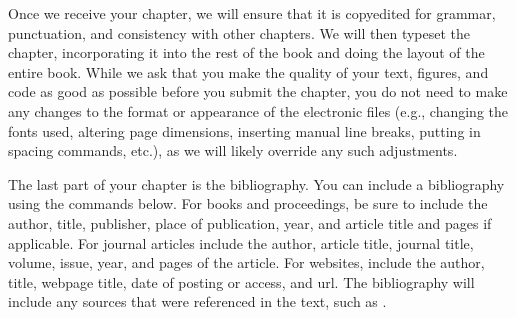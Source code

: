 Once we receive your chapter, we will ensure that it is copyedited for grammar, punctuation, and consistency with other chapters. We will then typeset the chapter, incorporating it into the rest of the book and doing the layout of the entire book. While we ask that you make the quality of your text, figures, and code as good as possible before you submit the chapter, you do not need to make any changes to the format or appearance of the electronic files (e.g., changing the fonts used, altering page dimensions, inserting manual line breaks, putting in spacing commands, etc.), as we will likely override any such adjustments.

The last part of your chapter is the bibliography. You can include a bibliography using the commands below.
For books and proceedings, be sure to include the author, title, publisher, place of publication, year, and article title and pages if applicable. For journal articles include the author, article title, journal title, volume, issue, year, and pages of the article. For websites, include the author, title, webpage title, date of posting or access, and url. The bibliography will include any sources that were referenced in the text, such as  \cite{Gunter09,Smith06,Gomez07,Wang11}.














